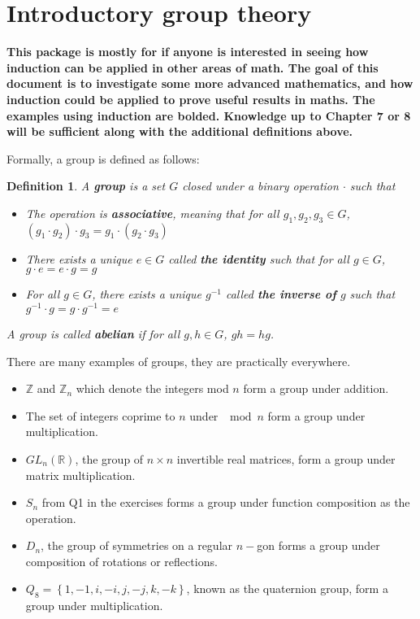 \documentclass[letterpaper,12pt]{article}
\newcommand{\set}[1]{\left\{ #1 \right\}}
\newtheorem{definition}{Definition}[section]
\begin{document}
\section{Introductory group theory}
\textbf{This package is mostly for if anyone is interested in seeing how induction can be applied in other areas of math. The goal of this document is to investigate some more advanced mathematics, and how induction could be applied to prove useful results in maths. The examples using induction are bolded. Knowledge up to Chapter 7 or 8 will be sufficient along with the additional definitions above.} \par
Formally, a group is defined as follows:
\setcounter{section}{1}
\begin{definition}{1}
    A \textbf{group} is a set $G$ closed under a binary operation $\cdot$ such that \begin{itemize}
        \item The operation is \textbf{associative}, meaning that for all $g_1,g_2,g_3 \in G$, $(g_1 \cdot g_2)\cdot g_3 = g_1 \cdot (g_2 \cdot g_3)$
        \item There exists a unique $e \in G$ called \textbf{the identity} such that for all $g \in G$, $g \cdot e = e \cdot g = g$
        \item For all $g \in G$, there exists a unique $g^{-1}$ called \textbf{the inverse of} $g$ such that $g^{-1} \cdot g = g \cdot g^{-1} = e$
    \end{itemize}
    A group is called \textbf{abelian} if for all $g,h \in G$, $gh=hg$.
\end{definition}
There are many examples of groups, they are practically everywhere. \begin{itemize}
    \item $\mathbb{Z}$ and $\mathbb{Z}_n$ which denote the integers mod $n$ form a group under addition.
    \item The set of integers coprime to $n$ under $\mod n$ form a group under multiplication.
    \item $GL_n(\mathbb{R})$, the group of $n\times n$ invertible real matrices, form a group under matrix multiplication.
    \item $S_n$ from Q1 in the exercises forms a group under function composition as the operation.
    \item $D_n$, the group of symmetries on a regular $n-$gon forms a group under composition of rotations or reflections.
    \item $Q_8 = \set{1,-1,i,-i,j,-j,k,-k}$, known as the quaternion group, form a group under multiplication.
\end{itemize}
\end{document}
